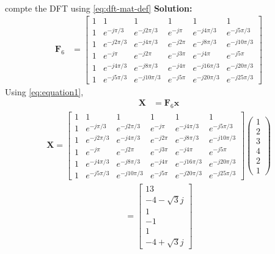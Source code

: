\documentclass[journal,12pt,twocolumn]{IEEEtran}
\newcommand{\solution}{\noindent \textbf{Solution: }}
\let\vec\mathbf
\numberwithin{equation}{section}
\renewcommand\thesection{\arabic{section}}
\newcommand{\myvec}[1]{\ensuremath{\begin{pmatrix}#1\end{pmatrix}}}
\begin{document}
\begin{enumerate}[label=\arabic*.,ref=\thesection.\theenumi]
\begin{align}
        \label{eq:equation1}
    \end{align}
    compte the DFT  
		using 
	    \eqref{eq:dft-mat-def}
\solution \begin{align}
\vec{F}_6&=\begin{bmatrix}
1&1&1&1&1&1\\1&e^{-j \pi/3 }&e^{-j 2 \pi/3 }&e^{-j \pi }&e^{-j 4 \pi/3 }&e^{-j 5 \pi/3 }\\1&e^{-j 2 \pi/3 }&e^{-j 4 \pi/3 }&e^{-j 2 \pi }&e^{-j 8\pi/3 }&e^{-j 10 \pi/3 }\\1&e^{-j \pi }&e^{-j 2 \pi }&e^{-j 3 \pi }&e^{-j 4 \pi }&e^{-j 5 \pi }\\1&e^{-j 4 \pi/3 }&e^{-j 8 \pi/3 }&e^{-j 4 \pi }&e^{-j 16 \pi/3 }&e^{-j 20 \pi/3 }\\1&e^{-j 5 \pi/3 }&e^{-j 10 \pi/3 }&e^{-j 5 \pi }&e^{-j 20 \pi/3 }&e^{-j 25 \pi/3 }
\end{bmatrix}
\end{align}
Using \eqref{eq:equation1},
\begin{align}
\vec{X}&=\vec{F}_6\vec{x}
\end{align}
\begin{align}
\vec{X}=\begin{bmatrix}
1&1&1&1&1&1\\1&e^{-j \pi/3 }&e^{-j 2 \pi/3 }&e^{-j \pi }&e^{-j 4 \pi/3 }&e^{-j 5 \pi/3 }\\1&e^{-j 2 \pi/3 }&e^{-j 4 \pi/3 }&e^{-j 2 \pi }&e^{-j 8\pi/3 }&e^{-j 10 \pi/3 }\\1&e^{-j \pi }&e^{-j 2 \pi }&e^{-j 3 \pi }&e^{-j 4 \pi }&e^{-j 5 \pi }\\1&e^{-j 4 \pi/3 }&e^{-j 8 \pi/3 }&e^{-j 4 \pi }&e^{-j 16 \pi/3 }&e^{-j 20 \pi/3 }\\1&e^{-j 5 \pi/3 }&e^{-j 10 \pi/3 }&e^{-j 5 \pi }&e^{-j 20 \pi/3 }&e^{-j 25 \pi/3 }
\end{bmatrix} \myvec{1\\2\\3\\4\\2\\1}
\end{align}
\begin{align}
=\begin{bmatrix}
13\\-4-\sqrt{3}j\\1\\-1\\1\\-4+\sqrt{3}j
\end{bmatrix}

\end{align}
\end{enumerate}
\end{document}
